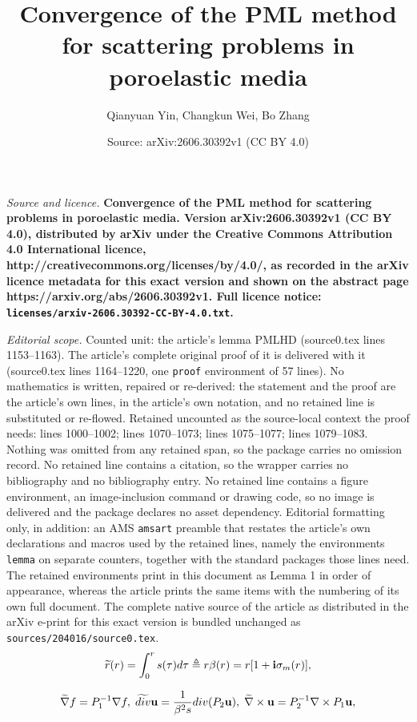 \documentclass[10pt,a4paper]{amsart}
\title{\bf Convergence of the PML method for scattering problems in poroelastic media}
\author{Qianyuan Yin, Changkun Wei, Bo Zhang}
\date{Source: arXiv:2606.30392v1 (CC BY 4.0)}
\newcommand{\dive}{{\rm div}}
\newcommand{\sig}{\sigma}
\newcommand{\wid}{\widetilde}
\begin{document}
\maketitle

\noindent\emph{Source and licence.} \bf Convergence of the PML method for scattering problems in poroelastic media. Version arXiv:2606.30392v1 (CC BY 4.0), distributed by arXiv under the Creative Commons Attribution 4.0 International licence, http://creativecommons.org/licenses/by/4.0/, as recorded in the arXiv licence metadata for this exact version and shown on the abstract page https://arxiv.org/abs/2606.30392v1. Full licence notice: \texttt{licenses/arxiv-2606.30392-CC-BY-4.0.txt}.\par\smallskip

\noindent\textit{Editorial scope.} Counted unit: the article's lemma PMLHD (source0.tex lines 1153--1163). The article's complete original proof of it is delivered with it (source0.tex lines 1164--1220, one \texttt{proof} environment of 57 lines). No mathematics is written, repaired or re-derived: the statement and the proof are the article's own lines, in the article's own notation, and no retained line is substituted or re-flowed.  Retained uncounted as the source-local context the proof needs: lines 1000--1002; lines 1070--1073; lines 1075--1077; lines 1079--1083.  Nothing was omitted from any retained span, so the package carries no omission record.  No retained line contains a citation, so the wrapper carries no bibliography and no bibliography entry.  No retained line contains a figure environment, an image-inclusion command or drawing code, so no image is delivered and the package declares no asset dependency.  Editorial formatting only, in addition: an AMS \texttt{amsart} preamble that restates the article's own declarations and macros used by the retained lines, namely the environments \texttt{lemma} on separate counters, together with the standard packages those lines need.  The retained environments print in this document as Lemma 1 in order of appearance, whereas the article prints the same items with the numbering of its own full document.  The complete native source of the article as distributed in the arXiv e-print for this exact version is bundled unchanged as \texttt{sources/204016/source0.tex}.
\begin{equation}\label{stretched_r}
\wid{r}(r)=\int_0^{r}s(\tau)d\tau \triangleq r\beta(r) = r[1+{\bf i}\sig_m(r)],
\end{equation}

\begin{equation}\label{relation_oper}
\wid{\nabla}f=P_1^{-1}\nabla f,\;\wid{\dive}\mathbf{u}=\frac{1}{\beta^2s}
\dive (P_2 \mathbf{u}),\;\wid{\nabla}\times\mathbf{u}=P_2^{-1}\nabla \times P_1\mathbf{u},
\end{equation}
\end{document}
